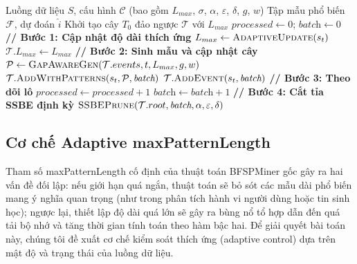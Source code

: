 \documentclass[conference]{IEEEtran}
\begin{document}
\begin{algorithm}[htbp]
\caption{BFSPMiner-Improved -- Vòng lặp xử lý chính}
\label{alg:main}
\begin{algorithmic}[1]
\REQUIRE Luồng dữ liệu $S$, cấu hình $\mathcal{C}$ (bao gồm $L_{max}$, $\sigma$, $\alpha$, $\varepsilon$, $\delta$, $g$, $w$)
\ENSURE Tập mẫu phổ biến $\mathcal{F}$, dự đoán $\hat{i}$
\STATE Khởi tạo cây $T_0$ đảo ngược $\mathcal{T}$ với $L_{max}$
\STATE $\textit{processed} \leftarrow 0$; $\textit{batch} \leftarrow 0$
    \STATE \textbf{// Bước 1: Cập nhật độ dài thích ứng}
        \STATE $L_{max} \leftarrow \textsc{AdaptiveUpdate}(s_t)$ 
        \STATE $\mathcal{T}.L_{max} \leftarrow L_{max}$
    \ENDIF
    \STATE \textbf{// Bước 2: Sinh mẫu và cập nhật cây}
        \STATE $\mathcal{P} \leftarrow \textsc{GapAwareGen}(\mathcal{T}.events, t, L_{max}, g, w)$ 
        \STATE $\mathcal{T}.\textsc{AddWithPatterns}(s_t, \mathcal{P}, \textit{batch})$
    \ELSE
        \STATE $\mathcal{T}.\textsc{AddEvent}(s_t, \textit{batch})$
    \ENDIF
    \STATE \textbf{// Bước 3: Theo dõi lô}
    \STATE $\textit{processed} \leftarrow \textit{processed} + 1$
        \STATE $\textit{batch} \leftarrow \textit{batch} + 1$
    \ENDIF
    \STATE \textbf{// Bước 4: Cắt tỉa SSBE định kỳ}
        \STATE $\textsc{SSBEPrune}(\mathcal{T}.root, \textit{batch}, \alpha, \varepsilon, \delta)$ 
    \ENDIF
\ENDFOR
\end{algorithmic}
\end{algorithm}

\subsection{Cơ chế Adaptive maxPatternLength}
Tham số maxPatternLength cố định của thuật toán BFSPMiner gốc gây ra hai vấn đề đối lập: nếu giới hạn quá ngắn, thuật toán sẽ bỏ sót các mẫu dài phổ biến mang ý nghĩa quan trọng (như trong phân tích hành vi người dùng hoặc tin sinh học); ngược lại, thiết lập độ dài quá lớn sẽ gây ra bùng nổ tổ hợp dẫn đến quá tải bộ nhớ và tăng thời gian tính toán theo hàm bậc hai. Để giải quyết bài toán này, chúng tôi đề xuất cơ chế kiểm soát thích ứng (adaptive control) dựa trên mật độ và trạng thái của luồng dữ liệu.
\end{document}

